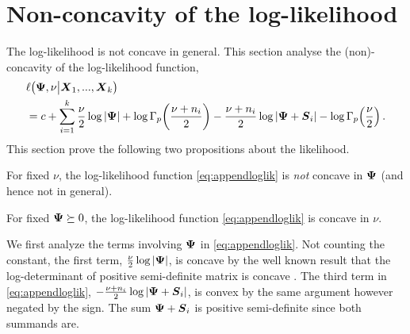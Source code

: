 \documentclass{article}\usepackage[]{graphicx}\usepackage[]{color}
\begin{document}
\section{Non-concavity of the log-likelihood}
\label{sec:concaveloglik}
The log-likelihood is not concave in general.
This section analyse the (non)-concavity of the log-likelihood function,
\small
\begin{align}
  &\ell\!\left(\vPsi, \nu \big| \vX_1, ..., \vX_k \right) \notag \\
  &= c + \sum_{i=1}^k
            \frac{\nu}{2}  \log |\vPsi|
            + \log \Gamma_p\!\left(\frac{\nu + n_i}{2}\right)  %
           - \frac{\nu + n_i}{2}\log|\vPsi +\vS_i|
            - \log \Gamma_p\!\left(\frac{\nu}{2}\right).
            \label{eq:appendloglik}
\end{align}
\normalsize
This section prove the following two propositions about the likelihood.
\begin{proposition}
For fixed $\nu$, the log-likelihood function \eqref{eq:appendloglik} is \emph{not} concave in ${\boldsymbol{\Psi}}$ (and hence not in general).
\end{proposition}
\begin{proposition}[Concavity in $\nu$]
For fixed ${\boldsymbol{\Psi}} \succeq 0$, the log-likelihood function \eqref{eq:appendloglik} is concave in $\nu$.
\end{proposition}

We first analyze the terms involving ${\boldsymbol{\Psi}}$ in \eqref{eq:appendloglik}. Not counting the constant, the first term, $\frac{\nu}{2}  \log | {\boldsymbol{\Psi}} |$, is concave by the well known result that the log-determinant of positive semi-definite matrix is concave \citep[See e.g.][pp. 73-74]{Boyd2004}.
The third term in \eqref{eq:appendloglik}, $- \frac{\nu + n_i}{2}\log|{\boldsymbol{\Psi}} + {\boldsymbol{S}}_i|$, is convex by the same argument however negated by the sign.
The sum ${\boldsymbol{\Psi}} +{\boldsymbol{S}}_i$ is positive semi-definite since both summands are.
\end{document}
